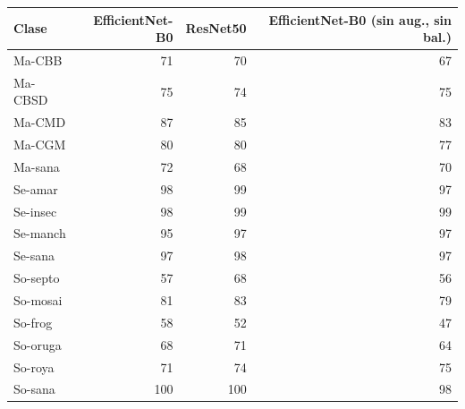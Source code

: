 \begin{tabular}{lrrr}
\hline
Clase & EfficientNet-B0 & ResNet50 & EfficientNet-B0 (sin aug., sin bal.) \\
\hline
Ma-CBB & 71 & 70 & 67 \\
Ma-CBSD & 75 & 74 & 75 \\
Ma-CMD & 87 & 85 & 83 \\
Ma-CGM & 80 & 80 & 77 \\
Ma-sana & 72 & 68 & 70 \\
Se-amar & 98 & 99 & 97 \\
Se-insec & 98 & 99 & 99 \\
Se-manch & 95 & 97 & 97 \\
Se-sana & 97 & 98 & 97 \\
So-septo & 57 & 68 & 56 \\
So-mosai & 81 & 83 & 79 \\
So-frog & 58 & 52 & 47 \\
So-oruga & 68 & 71 & 64 \\
So-roya & 71 & 74 & 75 \\
So-sana & 100 & 100 & 98 \\
\hline
\end{tabular}
